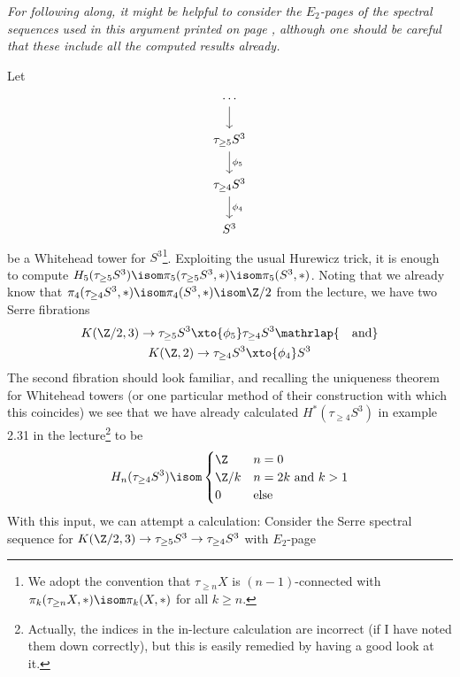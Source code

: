 \begin{solution}
	\emph{For following along, it might be helpful to consider the $E_2$-pages of the spectral sequences used in this argument printed on page \pageref{fig:firstspecseq}, although one should be careful that these include all the computed results already.}

	Let 
	\begin{equation*}
		\begin{tikzcd}
			\cdots
				\ar[d]
			\\
			\tau_{\geq 5} S^3
				\ar[d, "\phi_5"]
			\\
			\tau_{\geq 4} S^3
				\ar[d, "\phi_4"]
			\\
			S^3
		\end{tikzcd}
	\end{equation*}
	be a Whitehead tower for $S^3$\footnote{We adopt the convention that $\tau_{\geq n} X$ is $(n - 1)$-connected with $\pi_k(\tau_{\geq n} X, *) \isom \pi_k(X, *)$ for all $k \geq n$.}.
	Exploiting the usual Hurewicz trick, it is enough to compute $H_5(\tau_{\geq 5} S^3) \isom \pi_5(\tau_{\geq 5} S^3, *) \isom \pi_5(S^3, *)$.
	Noting that we already know that $\pi_4(\tau_{\geq 4} S^3, *) \isom \pi_4(S^3, *) \isom \Zn{2}$ from the lecture, we have two Serre fibrations
	\begin{gather*}
		K(\Zn{2}, 3) \to \tau_{\geq 5} S^3 \xto{\phi_5} \tau_{\geq 4} S^3 \mathrlap{\quad\text{and}}\\
		K(\Z, 2) \to \tau_{\geq 4} S^3 \xto{\phi_4} S^3
	\end{gather*}
	The second fibration should look familiar, and recalling the uniqueness theorem for Whitehead towers (or one particular method of their construction with which this coincides) we see that we have already calculated $H^*(\tau_{\geq 4} S^3)$ in example 2.31 in the lecture\footnote{Actually, the indices in the in-lecture calculation are incorrect (if I have noted them down correctly), but this is easily remedied by having a good look at it.} to be  
	\begin{equation*}
		H_n(\tau_{\geq 4} S^3) \isom \begin{cases}
			\Z 		& n = 0 \\
			\Zn{k} 	& n = 2k \text{ and } k > 1 \\
			0 		& \text{else}
		\end{cases}
	\end{equation*}
	With this input, we can attempt a calculation:
	Consider the Serre spectral sequence for $K(\Zn{2}, 3) \to \tau_{\geq 5} S^3 \to \tau_{\geq 4} S^3$ with $E_2$-page

\end{solution}
